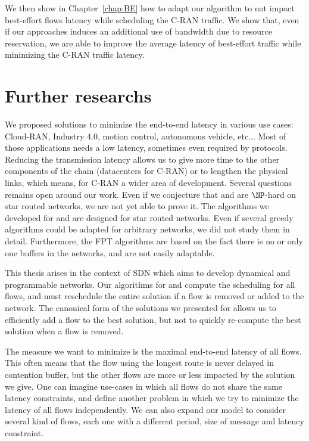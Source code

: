 We then show in Chapter~\ref{chap:BE} how to adapt our algorithm to not impact best-effort flows latency while scheduling the C-RAN traffic. We show that, even if our approaches induces an additional use of bandwidth due to resource reservation, we are able to improve the average latency of best-effort traffic while minimizing the C-RAN traffic latency.

\section*{Further researchs}

We proposed solutions to minimize the end-to-end latency in various use cases: Cloud-RAN, Industry 4.0, motion control, autonomous vehicle, etc... Most of those applications needs a low latency, sometimes even required by protocols. Reducing the transmission latency allows us to give more time to the other components of the chain (datacenters for C-RAN) or to lengthen the physical links, which means, for C-RAN a wider area of development.
Several questions remains open around our work. Even if we conjecture that \pazl and \pall are $\NP$-hard on star routed networks, we are not yet able to prove it. 
The algorithms we developed for \pazl and \pall are designed for star routed networks. Even if several greedy algorithms could be adapted for arbitrary networks, we did not study them in detail. Furthermore, the FPT algorithms are based on the fact there is no or only one buffers in the networks, and are not easily adaptable.

This thesis arises in the context of SDN which aims to develop dynamical and programmable networks. Our algorithms for \pazl and \pall compute the scheduling for all flows, and must reschedule the entire solution if a flow is removed or added to the network. The canonical form of the solutions we presented for \minstra allows us to efficiently add a flow to the best solution, but not to quickly re-compute the best solution when a flow is removed.

The measure we want to minimize is the maximal end-to-end latency of all flows. This often means that the flow using the longest route is never delayed in contention buffer, but the other flows are more or less impacted by the solution we give. One can imagine use-cases in which all flows do not share the same latency constraints, and define another problem in which we try to minimize the latency of all flows independently. We can also expand our model to consider several kind of flows, each one with a different period, size of message and latency constraint. 



